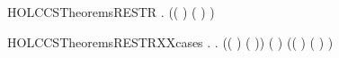 \newcommand{\HOLCCSTheoremsREPXXRelabelingXXTHM}{\UseVerbatim{HOLCCSTheoremsREPXXRelabelingXXTHM}}
\begin{SaveVerbatim}{HOLCCSTheoremsRESTR}
\HOLTokenTurnstile{} \HOLSymConst{\HOLTokenForall{}}    .
        \HOLTokenTransBegin{}\HOLTokenTransEnd {} \HOLSymConst{\HOLTokenConj{}}
       (( \HOLSymConst{=} \HOLConst{\ensuremath{\tau}}) \HOLSymConst{\HOLTokenDisj{}} ( \HOLSymConst{=}  ) \HOLSymConst{\HOLTokenConj{}}  \HOLConst{\HOLTokenNotIn{}}  \HOLSymConst{\HOLTokenConj{}}   \HOLConst{\HOLTokenNotIn{}} ) \HOLSymConst{\HOLTokenImp{}}
       \HOLConst{\ensuremath{\nu}}   \HOLTokenTransBegin{}\HOLTokenTransEnd \HOLConst{\ensuremath{\nu}}  
\end{SaveVerbatim}
\newcommand{\HOLCCSTheoremsRESTR}{\UseVerbatim{HOLCCSTheoremsRESTR}}
\begin{SaveVerbatim}{HOLCCSTheoremsRESTRXXcases}
\HOLTokenTurnstile{} \HOLSymConst{\HOLTokenForall{}}   .
       \HOLConst{\ensuremath{\nu}}   \HOLTokenTransBegin{}\HOLTokenTransEnd {} \HOLSymConst{\HOLTokenImp{}}
       \HOLSymConst{\HOLTokenExists{}}   .
           (( \HOLSymConst{=} ) \HOLSymConst{\HOLTokenConj{}} ( \HOLSymConst{=} )) \HOLSymConst{\HOLTokenConj{}} ( \HOLSymConst{=} \HOLConst{\ensuremath{\nu}}  ) \HOLSymConst{\HOLTokenConj{}}  \HOLTokenTransBegin{}\HOLTokenTransEnd {} \HOLSymConst{\HOLTokenConj{}}
           (( \HOLSymConst{=} \HOLConst{\ensuremath{\tau}}) \HOLSymConst{\HOLTokenDisj{}} ( \HOLSymConst{=}  ) \HOLSymConst{\HOLTokenConj{}}  \HOLConst{\HOLTokenNotIn{}}  \HOLSymConst{\HOLTokenConj{}}   \HOLConst{\HOLTokenNotIn{}} )
\end{SaveVerbatim}
